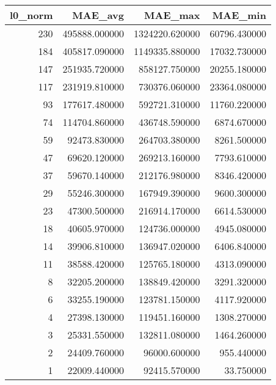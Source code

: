 \begin{tabular}{rrrr}
\toprule
l0_norm & MAE_avg & MAE_max & MAE_min \\
\midrule
230 & 495888.000000 & 1324220.620000 & 60796.430000 \\
184 & 405817.090000 & 1149335.880000 & 17032.730000 \\
147 & 251935.720000 & 858127.750000 & 20255.180000 \\
117 & 231919.810000 & 730376.060000 & 23364.080000 \\
93 & 177617.480000 & 592721.310000 & 11760.220000 \\
74 & 114704.860000 & 436748.590000 & 6874.670000 \\
59 & 92473.830000 & 264703.380000 & 8261.500000 \\
47 & 69620.120000 & 269213.160000 & 7793.610000 \\
37 & 59670.140000 & 212176.980000 & 8346.420000 \\
29 & 55246.300000 & 167949.390000 & 9600.300000 \\
23 & 47300.500000 & 216914.170000 & 6614.530000 \\
18 & 40605.970000 & 124736.000000 & 4945.080000 \\
14 & 39906.810000 & 136947.020000 & 6406.840000 \\
11 & 38588.420000 & 125765.180000 & 4313.090000 \\
8 & 32205.200000 & 138849.420000 & 3291.320000 \\
6 & 33255.190000 & 123781.150000 & 4117.920000 \\
4 & 27398.130000 & 119451.160000 & 1308.270000 \\
3 & 25331.550000 & 132811.080000 & 1464.260000 \\
2 & 24409.760000 & 96000.600000 & 955.440000 \\
1 & 22009.440000 & 92415.570000 & 33.750000 \\
\bottomrule
\end{tabular}
